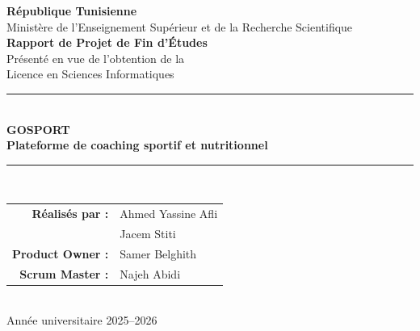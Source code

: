 \documentclass[12pt,a4paper]{report}
\begin{document}
\begin{titlepage}
\thispagestyle{empty}
\begin{center}
    \vspace*{0.5cm}
    {\Large \textbf{République Tunisienne}}\\
    {\large Ministère de l'Enseignement Supérieur et de la Recherche Scientifique}\\[1.2cm]

    {\Large \textbf{Rapport de Projet de Fin d'Études}}\\[0.8cm]
    {\large Présenté en vue de l'obtention de la}\\
    {\large Licence en Sciences Informatiques}\\[1.4cm]

    \rule{\textwidth}{0.6pt}\\[0.5cm]
    {\Huge \textbf{GOSPORT}}\\[0.4cm]
    {\LARGE \textbf{Plateforme de coaching sportif et nutritionnel}}\\[0.5cm]
    \rule{\textwidth}{0.6pt}\\[1.5cm]

    \begin{tabular}{rl}
        \textbf{Réalisés par :} & Ahmed Yassine Afli \\
                               & Jacem Stiti \\
        \textbf{Product Owner :} & Samer Belghith \\
        \textbf{Scrum Master :} & Najeh Abidi \\
    \end{tabular}\\[1.8cm]

    \vfill
    {\large Année universitaire 2025--2026}
\end{center}
\end{titlepage}

\cleardoublepage
{}

\dominitoc


\tableofcontents
\listoffigures
\listoftables
\mtcaddchapter

\clearpage
{}













\end{document}

